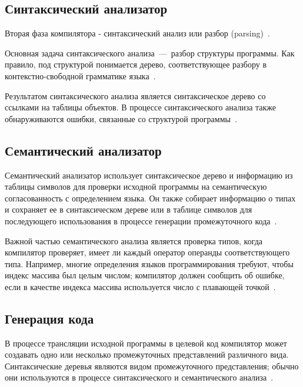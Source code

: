 
\subsection{Синтаксический анализатор}

Вторая фаза компилятора - синтаксический анализ или разбор (parsing)~\cite{aho2003}.

Основная задача синтаксического анализа~---~разбор структуры программы. Как правило, под структурой понимается дерево, соответствующее разбору в контекстно-свободной грамматике языка~\cite{serebrykov2001}.

Результатом синтаксического анализа является синтаксическое дерево со ссылками на таблицы объектов. В процессе синтаксического анализа также обнаруживаются ошибки, связанные со структурой программы~\cite{serebrykov2001}.


\subsection{Семантический анализатор}

Семантический анализатор использует синтаксическое дерево и информацию из таблицы символов для проверки исходной программы на семантическую согласованность с определением языка. Он также собирает информацию о типах и сохраняет ее в синтаксическом дереве или в таблице символов для последующего использования в процессе генерации промежуточного кода~\cite{aho2003}.

Важной частью семантического анализа является проверка типов, когда компилятор проверяет, имеет ли каждый оператор операнды соответствующего типа. Например, многие определения языков программирования требуют, чтобы индекс массива был целым числом; компилятор должен сообщить об ошибке, если в качестве индекса массива используется число с плавающей точкой~\cite{aho2003}.


\subsection{Генерация кода}

В процессе трансляции исходной программы в целевой код компилятор может создавать одно или несколько промежуточных представлений различного вида. Синтаксические деревья являются видом промежуточного представления; обычно они используются в процессе синтаксического и семантического анализа~\cite{aho2003}.

